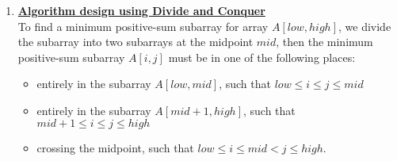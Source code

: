 \documentclass[11pt]{article}
\DeclarePairedDelimiter\ceil{\lceil}{\rceil}
\begin{document}
\begin{enumerate}
\begin{proof}
  By the induction hypothesis, we know that the algorithm can solve the
  sub-problem correctly when $n=k+1$, thus it can solve the problem
  correctly.
\end{proof}

\underline{\textbf{Run time analysis}} \\
Assume that list initialization, insertion all take constant time.
Line-2 to line-8 takes $\Theta(1)$ time. Line-9 to line-14 takes
$\Theta(n)$ time. Line-15 to line-19 takes $\Theta(\log n)$ time. For
line-20 to line-25, we are solving only one sub-problem for at most
$2^{\ceil{\lg (n+1)} - 1} - 1$ times. Let $T(n)$ be the run time
function for the algorithm, we have:

\begin{equation}
  \begin{split}
  T(n) & \leq T(2^{\ceil{\lg (n+1)} - 1} - 1) + \Theta(n) + \Theta(\log
  n) + \Theta(1) \\
  & = T(2^{\ceil{\lg (n+1)} - 1} - 1) + \Theta(n)
  \end{split}
\end{equation}

Let $k = \ceil{\lg (n+1)}$.

\begin{equation}
  \begin{split}
    T(n) & \leq T(2^{k-1} - 1) + \Theta(2^k - 1) \\
    & = T(2^{k-2} - 1) + \Theta(2^k - 1) + \Theta(2^{k-1} - 1) \\
    & = T(2^1 - 1) + \sum_{i=2}^{k} \Theta(2^i-1) \\
    & = T(1) + \Theta(\sum_{i=2}^{k} (2^i-1)) \\
    & = \Theta(1) + \Theta(2^{k+1} - 4) \\
    & = \Theta(2^{k+1} - 4) \\
    & = 2\Theta(2^{k} - 2) \\
    & \leq 2\Theta(n) \\
  \end{split}
\end{equation}

\item %
\underline{\textbf{Algorithm design using Divide and Conquer}} \\
To find a minimum positive-sum subarray for array $A[low, high]$, we
divide the subarray into two subarrays at the midpoint $mid$, then the
minimum positive-sum subarray $A[i,j]$ must be in one of the following places:
\begin{itemize}
\item entirely in the subarray $A[low, mid]$, such that $low \leq i
  \leq j \leq mid$
\item entirely in the subarray $A[mid+1, high]$, such that $mid+1 \leq i
  \leq j \leq high$
\item crossing the midpoint, such that $low \leq i \leq mid < j
  \leq high$.
\end{itemize}


\end{enumerate}
\end{document}
